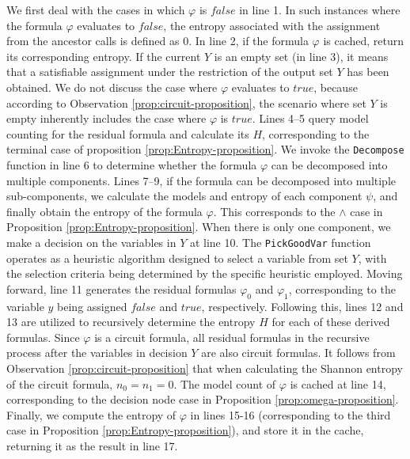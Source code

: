 We first deal with the cases in which $\varphi$ is $\mathit{false}$ in line 1.  
In such instances where the formula $\varphi$ evaluates to $\mathit{false}$, the entropy associated with the assignment from the ancestor calls is defined as 0.
In line 2, if the formula $\varphi$ is cached, return its corresponding entropy.
If the current $Y$ is an empty set (in line 3), it means that a satisfiable assignment under the restriction of the output set $Y$ has been obtained. 
We do not discuss the case where $\varphi$ evaluates to $\mathit{true}$, because according to Observation \ref{prop:circuit-proposition}, the scenario where set $Y$ is empty inherently includes the case where $\varphi$ is $\mathit{true}$. 
Lines 4--5 query model counting for the residual formula and calculate its $\mathit{H}$, corresponding to the terminal case of proposition \ref{prop:Entropy-proposition}.
We invoke the \texttt{Decompose} function in line 6 to determine whether the formula $\varphi$ can be decomposed into multiple components.
Lines 7--9, if the formula can be decomposed into multiple sub-components, we calculate the models and entropy of each component $\psi$, and finally obtain the entropy of the formula $\varphi$. This corresponds to the $\wedge$ case in Proposition \ref{prop:Entropy-proposition}.
When there is only one component, we make a decision on the variables in $Y$ at line 10.
The \texttt{PickGoodVar} function operates as a heuristic algorithm designed to select a variable from set $Y$, with the selection criteria being determined by the specific heuristic employed.
Moving forward, line 11 generates the residual formulas $\varphi_0$ and  $\varphi_1$, corresponding to the variable $y$ being assigned $\mathit{false}$ and $\mathit{true}$, respectively.
Following this, lines 12 and 13 are utilized to recursively determine the entropy $\mathit{H}$ for each of these derived formulas.
Since $\varphi$ is a circuit formula, all residual formulas in the recursive process after the variables in decision $Y$ are also circuit formulas.
It follows from Observation \ref{prop:circuit-proposition} that when calculating the Shannon entropy of the circuit formula, $n_0 = n_1 = 0$.
The model count of $\varphi$ is cached at line 14, corresponding to the decision node case in Proposition \ref{prop:omega-proposition}.
Finally, we compute the entropy of $\varphi$ in lines 15-16 (corresponding to the third case in Proposition \ref{prop:Entropy-proposition}), and store it in the cache, returning it as the result in line 17.


